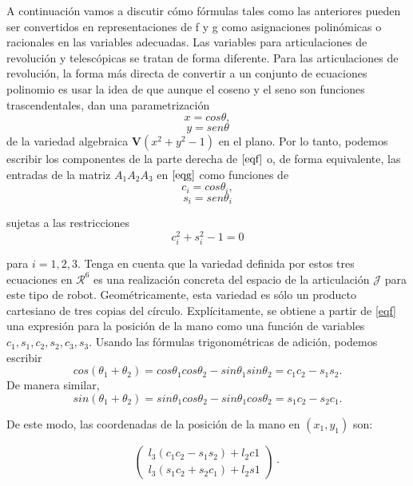 A continuación vamos a discutir cómo fórmulas tales como las anteriores pueden ser convertidos en representaciones de f y g como asignaciones polinómicas o racionales en las variables adecuadas.
Las variables para articulaciones de revolución y telescópicas se tratan de forma diferente. Para las articulaciones de revolución, la forma más directa de convertir a un conjunto de ecuaciones polinomio es usar la idea de que aunque el coseno y el seno son funciones trascendentales, dan una parametrización
$$ x = cos\theta,$$
$$ y = sen\theta $$
de la variedad algebraica $\mathbf{V}(x^{2}+y^{2}-1)$ en el plano. Por lo tanto, podemos escribir los componentes de la parte derecha de $\ref{eqf}$ o, de forma equivalente, las entradas de la matriz $A_{1}A_{2}A_{3}$ en $\ref{eqg}$ como funciones de 
$$ c_{i} = cos\theta_{i},$$
$$ s_{i} = sen\theta_{i} $$

sujetas a las restricciones
\begin{equation}\label{eqcossin}
c_{i}^{2}+s_{i}^{2}-1=0
\end{equation}

para $i = 1,2,3$. Tenga en cuenta que la variedad definida por estos tres ecuaciones en $\mathcal{R}^{6}$ es una realización concreta del espacio de la articulación $\mathcal{J}$  para este tipo de robot. Geométricamente, esta variedad es sólo un producto cartesiano de tres copias del círculo.
Explícitamente, se obtiene a partir de \ref{eqf} una expresión para la posición de la mano como una función de variables $c_{1},s_{1},c_{2},s_{2},c_{3},s_{3}$. Usando las fórmulas trigonométricas de adición, podemos escribir
\[
cos(\theta_{1} + \theta_{2}) = cos\theta_{1}cos\theta_{2} - sin\theta_{1}sin\theta_{2} = c_{1}c_{2} - s_{1}s_{2}.
\]
De manera similar,
\[
sin(\theta_{1} + \theta_{2}) = sin\theta_{1}cos\theta_{2} - sin\theta_{1}cos\theta_{2} = s_{1}c_{2} - s_{2}c_{1}.
\]

De este modo, las coordenadas de la posición de la mano en $(x_{1},y_{1})$ son:

\begin{equation}\label{eqcs}
\begin{pmatrix} 
l_{3}(c_{1}c_{2} - s_{1}s_{2})+l_{2}c{1}\\
l_{3}(s_{1}c_{2} + s_{2}c_{1})+l_{2}s{1}
\end{pmatrix} \cdot
\end{equation}




















